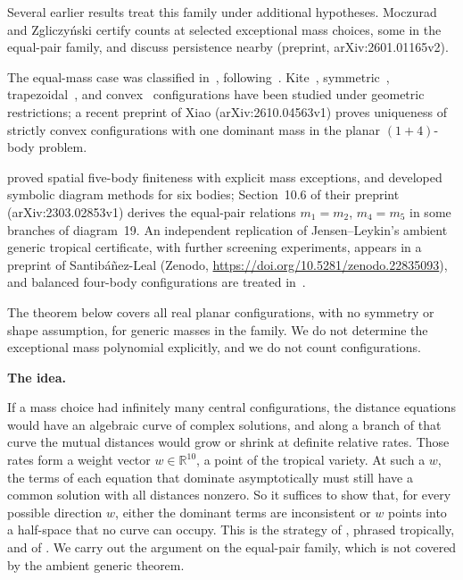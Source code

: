 \documentclass[11pt]{amsart}
\newcommand{\topic}[1]{\par\addvspace{1.4ex}\noindent\textbf{#1}\par\nobreak\smallskip\noindent}
\theoremstyle{definition}\newtheorem{definition}[theorem]{Definition}\theoremstyle{remark}\newtheorem{remark}[theorem]{Remark}
\begin{document}
Several earlier results treat this family under additional hypotheses. Moczurad and Zgliczy\'nski certify counts at selected exceptional mass choices, some in the equal-pair family, and discuss persistence nearby (preprint, arXiv:2601.01165v2).

The equal-mass case was classified in~\citep{MZ19}, following~\citep{LS}. Kite~\citep{HK}, symmetric~\citep{GL}, trapezoidal~\citep{SKS}, and convex~\citep{FGMS} configurations have been studied under geometric restrictions; a recent preprint of Xiao (arXiv:2610.04563v1) proves uniqueness of strictly convex configurations with one dominant mass in the planar $(1+4)$-body problem.

\citet{HJ} proved spatial five-body finiteness with explicit mass exceptions, and \citet{CC1,CC2} developed symbolic diagram methods for six bodies; Section~10.6 of their preprint (arXiv:2303.02853v1) derives the equal-pair relations $m_1=m_2$, $m_4=m_5$ in some branches of diagram~19. An independent replication of Jensen--Leykin's ambient generic tropical certificate, with further screening experiments, appears in a preprint of Santib\'a\~nez-Leal (Zenodo, \url{https://doi.org/10.5281/zenodo.22835093}), and balanced four-body configurations are treated in~\citep{WZ}.

The theorem below covers all real planar configurations, with no symmetry or shape assumption, for generic masses in the family. We do not determine the exceptional mass polynomial explicitly, and we do not count configurations.

\topic{The idea.} If a mass choice had infinitely many central configurations, the distance equations would have an algebraic curve of complex solutions, and along a branch of that curve the mutual distances would grow or shrink at definite relative rates. Those rates form a weight vector $w\in\mathbb R^{10}$, a point of the tropical variety. At such a $w$, the terms of each equation that dominate asymptotically must still have a common solution with all distances nonzero. So it suffices to show that, for every possible direction $w$, either the dominant terms are inconsistent or $w$ points into a half-space that no curve can occupy. This is the strategy of \citet{HM}, phrased tropically, and of \citet{JL}. We carry out the argument on the equal-pair family, which is not covered by the ambient generic theorem.
\end{document}
